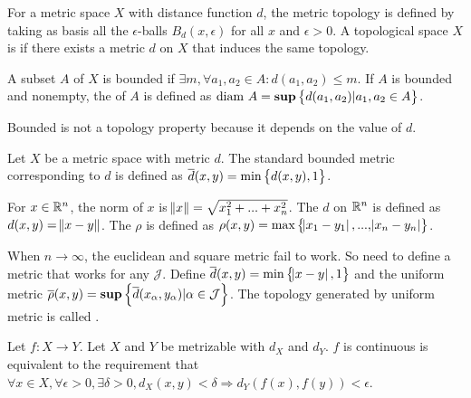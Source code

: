 \begin{definition}
    For a metric space $X$ with distance function $d$, the metric topology is defined by taking as basis all the $\epsilon$-balls $B_d(x,\epsilon)$ for all $x$ and $\epsilon > 0$. A topological space $X$ is  if there exists a metric $d$ on $X$ that induces the same topology.
\end{definition}

\begin{definition}
    A subset $A$ of $X$ is bounded if $\exists m, \forall a_1, a_2 \in A: d(a_1, a_2) \leq m$. If $A$ is bounded and nonempty, the  of $A$ is defined as $\text{diam } A = \mathbf{sup} \set{d(a_1, a_2)| a_1, a_2 \in A}$.
    
    Bounded is not a topology property because it depends on the value of $d$.
\end{definition}

\begin{definition}
    Let $X$ be a metric space with metric $d$. The standard bounded metric corresponding to $d$ is defined as $\overline{d}(x,y) = \text{min}\set{d(x,y), 1} $.
\end{definition}

\begin{definition}
    For $x \in \mathbb{R}^n$, the norm of $x$ is $\norm{x} = \sqrt{x_1^2 + ... + x_n^2}$. The  $d$ on $\mathbb{R}^n$ is defined as $d(x,y) = \norm{x - y}$. The  $\rho$ is defined as $\rho (x,y) = \text{max}\set{\abs{x_1 - y_1}, ... , \abs{x_n - y_n} }$.
\end{definition}

\begin{definition}
    When $n \rightarrow \infty$, the euclidean and square metric fail to work. So need to define a metric that works for any $\mathcal{J}$. Define $\overline{d}(x,y) = \text{min}\set{\abs{x - y} , 1}$ and the uniform metric $\overline{\rho}(x,y) = \mathbf{sup} \set{ \overline{d}(x_{\alpha}, y_{\alpha}) | \alpha \in \mathcal{J}} $. The topology generated by uniform metric is called .
\end{definition}
\begin{theorem}
Let $f: X \rightarrow Y$. Let $X$ and $Y$ be metrizable with $d_X$ and $d_Y$. $f$ is continuous is equivalent to the requirement that $\forall x \in X, \forall \epsilon > 0, \exists \delta > 0, d_X (x,y) < \delta \Rightarrow d_Y \left(f(x), f(y) \right) < \epsilon $.
\end{theorem}


